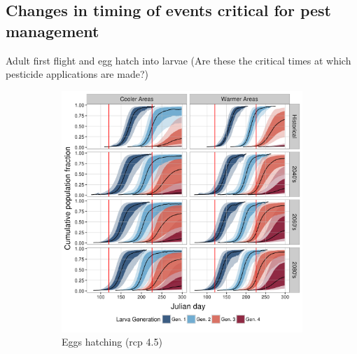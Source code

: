 \documentclass[12pt]{article}
\theoremstyle{plain}
\theoremstyle{definition}
\theoremstyle{definition}
\begin{document}
\subsection{Changes in timing of events critical for pest management}
Adult first flight and egg hatch into larvae (Are these the critical times at which pesticide applications are made?) 

\begin{figure}[h!]
    \centering
    \begin{subfigure}[b]{0.48\textwidth}
        \includegraphics[width=\textwidth]{figures/eggHatch_rcp45}
        \caption{Eggs hatching (rcp 4.5)}
        \label{fig:Eggs_Hatch_45)}
    \end{subfigure}
    ~ %
    \begin{subfigure}[b]{0.48\textwidth}

\end{subfigure}
\end{figure}
\end{document}
